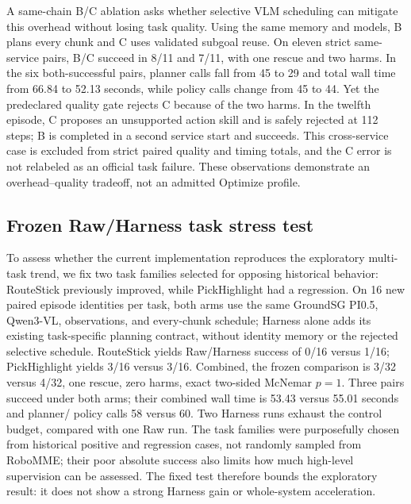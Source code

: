 \documentclass[letterpaper,10pt,conference]{ieeeconf}
\begin{document}
A same-chain B/C ablation asks whether selective VLM scheduling can mitigate
this overhead without losing task quality. Using the same memory and models,
B plans every chunk and C uses validated subgoal reuse. On eleven strict
same-service pairs, B/C succeed in 8/11 and 7/11, with one rescue and two
harms. In the six both-successful pairs, planner calls fall from 45 to 29
and total wall time from 66.84 to 52.13 seconds, while policy calls change
from 45 to 44. Yet the predeclared quality gate rejects C because of the
two harms. In the twelfth episode, C proposes an unsupported action skill
and is safely rejected at 112 steps; B is completed in a second service
start and succeeds. This cross-service case is excluded from strict paired
quality and timing totals, and the C error is not relabeled as an official
task failure. These observations demonstrate an overhead--quality tradeoff,
not an admitted Optimize profile.

\subsection{Frozen Raw/Harness task stress test}
To assess whether the current implementation reproduces the exploratory
multi-task trend, we fix two task families selected for opposing historical
behavior: RouteStick previously improved, while PickHighlight had a
regression. On 16 new paired episode identities per task, both arms use the
same GroundSG PI0.5, Qwen3-VL, observations, and every-chunk schedule;
Harness alone adds its existing task-specific planning contract, without
identity memory or the rejected selective schedule. RouteStick yields
Raw/Harness success of 0/16 versus 1/16; PickHighlight yields 3/16 versus
3/16. Combined, the frozen comparison is 3/32 versus 4/32, one rescue,
zero harms, exact two-sided McNemar $p=1$. Three pairs succeed under both
arms; their combined wall time is 53.43 versus 55.01 seconds and planner/
policy calls 58 versus 60. Two Harness runs exhaust the control budget,
compared with one Raw run. The task families were purposefully chosen from
historical positive and regression cases, not randomly sampled from RoboMME;
their poor absolute success also limits how much high-level supervision can
be assessed. The fixed test therefore bounds the exploratory result: it
does not show a strong Harness gain or whole-system acceleration.
\end{document}
